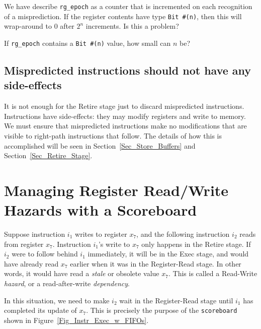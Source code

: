 \hdivider

\Exercise

We have describe \verb|rg_epoch| as a counter that is incremented on
each recognition of a misprediction.  If the register contents have
type \verb|Bit #(n)|, then this will wrap-around to 0 after $2^n$
increments.  Is this a problem?

\Exercise

If \verb|rg_epoch| contains a \verb|Bit #(n)| value, how small can $n$ be?

\Endexercise


\subsection{Mispredicted instructions should not have any side-effects}

It is not enough for the Retire stage just to discard mispredicted
instructions.  Instructions have side-effects: they may modify
registers and write to memory.  We must ensure that mispredicted
instructions make no modifications that are visible to right-path
instructions that follow.  The details of how this is accomplished
will be seen in Section~\ref{Sec_Store_Buffers} and
Section~\ref{Sec_Retire_Stage}.


\section{Managing Register Read/Write Hazards with a Scoreboard}

\label{Sec_Scoreboards}

Suppose instruction $i_1$ writes to register $x_7$, and the following
instruction $i_2$ reads from register $x_7$.  Instruction $i_1$'s
write to $x_7$ only happens in the Retire stage.  If $i_2$ were to
follow behind $i_1$ immediately, it will be in the Exec stage, and
would have already read $x_7$ earlier when it was in the Register-Read
stage.  In other words, it would have read a \emph{stale} or obsolete
value $x_7$.  This is called a Read-Write \emph{hazard}, or a
read-after-write \emph{dependency}.

In this situation, we need to make $i_2$ wait in the Register-Read
stage until $i_1$ has completed its update of $x_7$.  This is
precisely the purpose of the \verb|scoreboard| shown in
Figure~\ref{Fig_Instr_Exec_w_FIFOs}.

